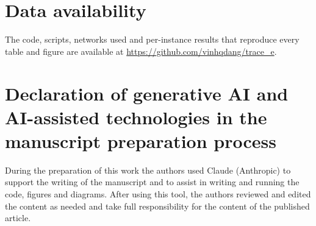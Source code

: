 \documentclass[preprint,11pt]{elsarticle}
\theoremstyle{definition}
\theoremstyle{remark}
\begin{document}
\section*{Data availability}
The code, scripts, networks used and per-instance results that reproduce every table and figure are available at \url{https://github.com/vinhqdang/trace_e}.

\section*{Declaration of generative AI and AI-assisted technologies in the manuscript preparation process}
During the preparation of this work the authors used Claude (Anthropic) to support the writing of the manuscript and to assist in writing and running the code, figures and diagrams. After using this tool, the authors reviewed and edited the content as needed and take full responsibility for the content of the published article.
\end{document}
